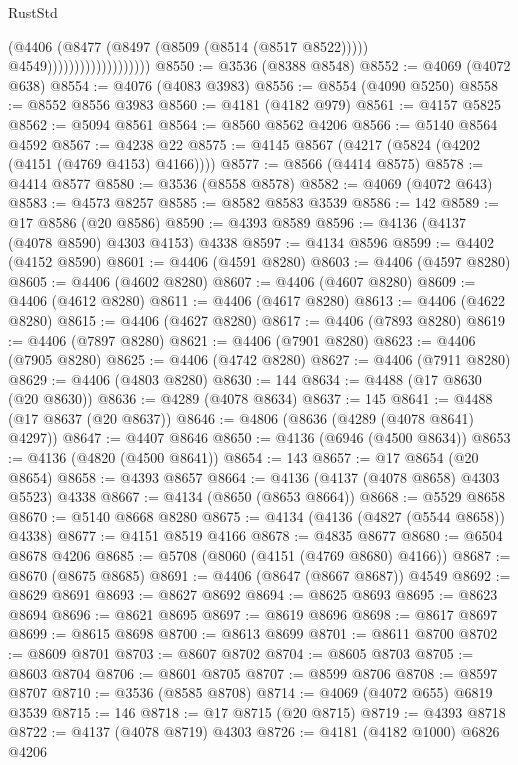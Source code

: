 \begin{lexlean}{RustStd}
\begin{coremodule}
                                        (@4406
                                          (@8477 (@8497 (@8509 (@8514 (@8517 @8522)))))
                                          @4549)))))))))))))))))))
@8550 := @3536 (@8388 @8548)
@8552 := @4069 (@4072 @638)
@8554 := @4076 (@4083 @3983)
@8556 := @8554 (@4090 @5250)
@8558 := @8552 @8556 @3983
@8560 := @4181 (@4182 @979)
@8561 := @4157 @5825
@8562 := @5094 @8561
@8564 := @8560 @8562 @4206
@8566 := @5140 @8564 @4592
@8567 := @4238 @22
@8575 := @4145 @8567 (@4217 (@5824 (@4202 (@4151 (@4769 @4153) @4166))))
@8577 := @8566 (@4414 @8575)
@8578 := @4414 @8577
@8580 := @3536 (@8558 @8578)
@8582 := @4069 (@4072 @643)
@8583 := @4573 @8257
@8585 := @8582 @8583 @3539
@8586 := 142
@8589 := @17 @8586 (@20 @8586)
@8590 := @4393 @8589
@8596 := @4136 (@4137 (@4078 @8590) @4303 @4153) @4338
@8597 := @4134 @8596
@8599 := @4402 (@4152 @8590)
@8601 := @4406 (@4591 @8280)
@8603 := @4406 (@4597 @8280)
@8605 := @4406 (@4602 @8280)
@8607 := @4406 (@4607 @8280)
@8609 := @4406 (@4612 @8280)
@8611 := @4406 (@4617 @8280)
@8613 := @4406 (@4622 @8280)
@8615 := @4406 (@4627 @8280)
@8617 := @4406 (@7893 @8280)
@8619 := @4406 (@7897 @8280)
@8621 := @4406 (@7901 @8280)
@8623 := @4406 (@7905 @8280)
@8625 := @4406 (@4742 @8280)
@8627 := @4406 (@7911 @8280)
@8629 := @4406 (@4803 @8280)
@8630 := 144
@8634 := @4488 (@17 @8630 (@20 @8630))
@8636 := @4289 (@4078 @8634)
@8637 := 145
@8641 := @4488 (@17 @8637 (@20 @8637))
@8646 := @4806 (@8636 (@4289 (@4078 @8641) @4297))
@8647 := @4407 @8646
@8650 := @4136 (@6946 (@4500 @8634))
@8653 := @4136 (@4820 (@4500 @8641))
@8654 := 143
@8657 := @17 @8654 (@20 @8654)
@8658 := @4393 @8657
@8664 := @4136 (@4137 (@4078 @8658) @4303 @5523) @4338
@8667 := @4134 (@8650 (@8653 @8664))
@8668 := @5529 @8658
@8670 := @5140 @8668 @8280
@8675 := @4134 (@4136 (@4827 (@5544 @8658)) @4338)
@8677 := @4151 @8519 @4166
@8678 := @4835 @8677
@8680 := @6504 @8678 @4206
@8685 := @5708 (@8060 (@4151 (@4769 @8680) @4166))
@8687 := @8670 (@8675 @8685)
@8691 := @4406 (@8647 (@8667 @8687)) @4549
@8692 := @8629 @8691
@8693 := @8627 @8692
@8694 := @8625 @8693
@8695 := @8623 @8694
@8696 := @8621 @8695
@8697 := @8619 @8696
@8698 := @8617 @8697
@8699 := @8615 @8698
@8700 := @8613 @8699
@8701 := @8611 @8700
@8702 := @8609 @8701
@8703 := @8607 @8702
@8704 := @8605 @8703
@8705 := @8603 @8704
@8706 := @8601 @8705
@8707 := @8599 @8706
@8708 := @8597 @8707
@8710 := @3536 (@8585 @8708)
@8714 := @4069 (@4072 @655) @6819 @3539
@8715 := 146
@8718 := @17 @8715 (@20 @8715)
@8719 := @4393 @8718
@8722 := @4137 (@4078 @8719) @4303
@8726 := @4181 (@4182 @1000) @6826 @4206

\end{coremodule}
\end{lexlean}
